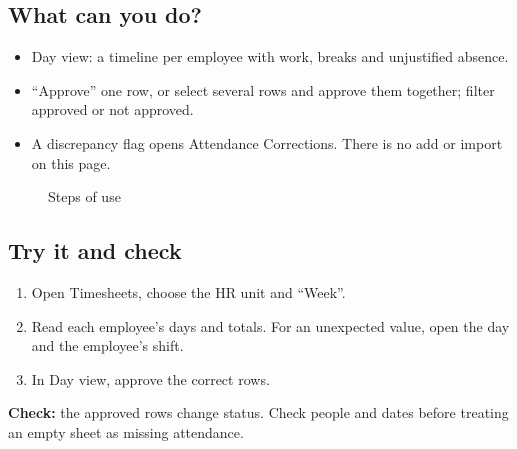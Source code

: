 \subsection{What can you do?}

\begin{itemize}
  \item Day view: a timeline per employee with work, breaks and unjustified absence.
  \item “Approve” one row, or select several rows and approve them together; filter approved or not approved.
  \item A discrepancy flag opens Attendance Corrections. There is no add or import on this page.
\end{itemize}

\begin{figure}[H]
\centering
{}
\rclegend
\caption{Steps of use}
\label{fig:hr-feature-timesheets-flow}
\end{figure}

\subsection{Try it and check}

\begin{enumerate}
  \item Open Timesheets, choose the HR unit and “Week”.
  \item Read each employee's days and totals. For an unexpected value, open the day and the employee's shift.
  \item In Day view, approve the correct rows.
\end{enumerate}

\textbf{Check:} the approved rows change status. Check people and dates before treating an empty sheet as missing attendance.

